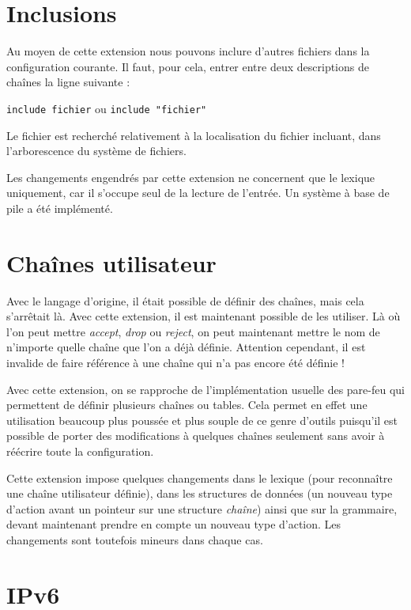 \documentclass[a4paper,11pt]{report}
\begin{document}
\section{Inclusions}

Au moyen de cette extension nous pouvons inclure d'autres fichiers dans la
configuration courante. Il faut, pour cela, entrer entre deux descriptions de
chaînes la ligne suivante :

\verb!include fichier! ou \verb!include "fichier"!

\bigskip
Le fichier est recherché relativement à la localisation du fichier incluant,
dans l'arborescence du système de fichiers.

Les changements engendrés par cette extension ne concernent que le lexique
uniquement, car il s'occupe seul de la lecture de l'entrée. Un système à base
de pile a été implémenté.

\section{Chaînes utilisateur}

Avec le langage d'origine, il était possible de définir des chaînes, mais cela
s'arrêtait là. Avec cette extension, il est maintenant possible de les
utiliser. Là où l'on peut mettre \emph{accept}, \emph{drop} ou \emph{reject},
on peut maintenant mettre le nom de n'importe quelle chaîne que l'on a déjà
définie. Attention cependant, il est invalide de faire référence à une chaîne
qui n'a pas encore été définie !

Avec cette extension, on se rapproche de l'implémentation usuelle des pare-feu
qui permettent de définir plusieurs chaînes ou tables. Cela permet en effet
une utilisation beaucoup plus poussée et plus souple de ce genre d'outils
puisqu'il est possible de porter des modifications à quelques chaînes
seulement sans avoir à réécrire toute la configuration.

Cette extension impose quelques changements dans le lexique (pour reconnaître
une chaîne utilisateur définie), dans les structures de données (un nouveau
type d'action avant un pointeur sur une structure \emph{chaîne}) ainsi que sur
la grammaire, devant maintenant prendre en compte un nouveau type d'action.
Les changements sont toutefois mineurs dans chaque cas.

\section{IPv6}
\end{document}
